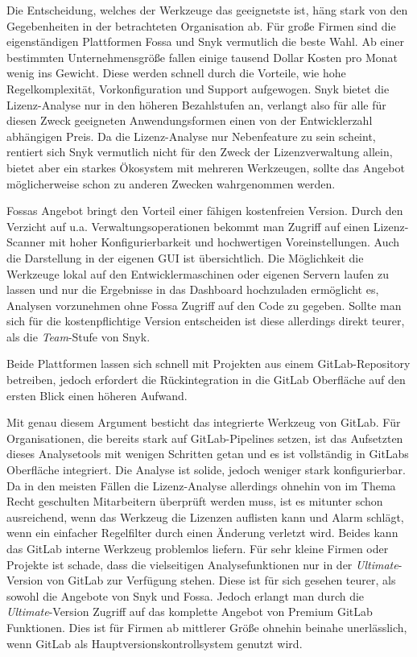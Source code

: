 Die Entscheidung, welches der Werkzeuge das geeignetste ist, häng stark von den Gegebenheiten in der betrachteten Organisation ab. 
Für große Firmen sind die eigenständigen Plattformen Fossa und Snyk vermutlich die beste Wahl. Ab einer bestimmten Unternehmensgröße fallen einige tausend Dollar Kosten pro Monat wenig ins Gewicht. Diese werden schnell durch die Vorteile, wie hohe Regelkomplexität, Vorkonfiguration und Support aufgewogen. 
Snyk bietet die Lizenz-Analyse nur in den höheren Bezahlstufen an, verlangt also für alle für diesen Zweck geeigneten Anwendungsformen einen von der Entwicklerzahl abhängigen Preis. Da die Lizenz-Analyse nur Nebenfeature zu sein scheint, rentiert sich Snyk vermutlich nicht für den Zweck der Lizenzverwaltung allein, bietet aber ein starkes Ökosystem mit mehreren Werkzeugen, sollte das Angebot möglicherweise schon zu anderen Zwecken wahrgenommen werden.

Fossas Angebot bringt den Vorteil einer fähigen kostenfreien Version. Durch den Verzicht auf u.a. Verwaltungsoperationen bekommt man Zugriff auf einen Lizenz-Scanner mit hoher Konfigurierbarkeit und hochwertigen Voreinstellungen. Auch die Darstellung in der eigenen GUI ist übersichtlich. Die Möglichkeit die Werkzeuge lokal auf den Entwicklermaschinen oder eigenen Servern laufen zu lassen und nur die Ergebnisse in das Dashboard hochzuladen ermöglicht es, Analysen vorzunehmen ohne Fossa Zugriff auf den Code zu gegeben. Sollte man sich für die kostenpflichtige Version entscheiden ist diese allerdings direkt teurer, als die \emph{Team}-Stufe von Snyk.

Beide Plattformen lassen sich schnell mit Projekten aus einem GitLab-Repository betreiben, jedoch erfordert die Rückintegration in die GitLab Oberfläche auf den ersten Blick einen höheren Aufwand.

Mit genau diesem Argument besticht das integrierte Werkzeug von GitLab. Für Organisationen, die bereits stark auf GitLab-Pipelines setzen, ist das Aufsetzten dieses Analysetools mit wenigen Schritten getan und es ist vollständig in GitLabs Oberfläche integriert. Die Analyse ist solide, jedoch weniger stark konfigurierbar. Da in den meisten Fällen die Lizenz-Analyse allerdings ohnehin von im Thema Recht geschulten Mitarbeitern überprüft werden muss, ist es mitunter schon ausreichend, wenn das Werkzeug die Lizenzen auflisten kann und Alarm schlägt, wenn ein einfacher Regelfilter durch einen Änderung verletzt wird. Beides kann das GitLab interne Werkzeug problemlos liefern. 
Für sehr kleine Firmen oder Projekte ist schade, dass die vielseitigen Analysefunktionen nur in der \emph{Ultimate}-Version von GitLab zur Verfügung stehen. Diese ist für sich gesehen teurer, als sowohl die Angebote von Snyk und Fossa. Jedoch erlangt man durch die \emph{Ultimate}-Version Zugriff auf das komplette Angebot von Premium GitLab Funktionen. Dies ist für Firmen ab mittlerer Größe ohnehin beinahe unerlässlich, wenn GitLab als Hauptversionskontrollsystem genutzt wird. 

